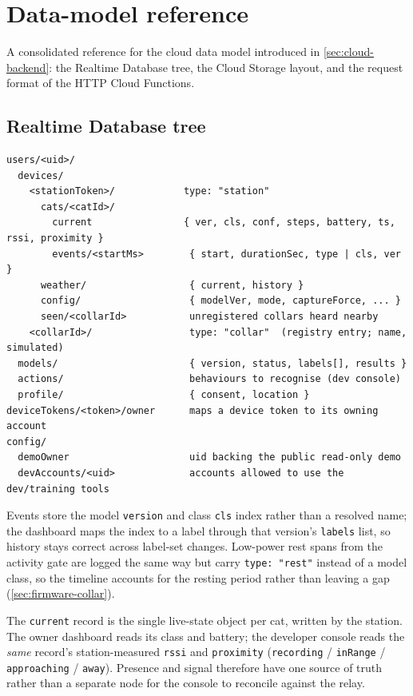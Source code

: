 \section{Data-model reference}
\label{sec:appendix-schema}

A consolidated reference for the cloud data model introduced in \cref{sec:cloud-backend}: the Realtime
Database tree, the Cloud Storage layout, and the request format of the HTTP Cloud Functions.

\subsection{Realtime Database tree}

\begin{lstlisting}[numbers=none,caption={Realtime Database layout (owner-scoped).},label={lst:rtdb}]
users/<uid>/
  devices/
    <stationToken>/            type: "station"
      cats/<catId>/
        current                { ver, cls, conf, steps, battery, ts, rssi, proximity }
        events/<startMs>        { start, durationSec, type | cls, ver }
      weather/                  { current, history }
      config/                   { modelVer, mode, captureForce, ... }
      seen/<collarId>           unregistered collars heard nearby
    <collarId>/                 type: "collar"  (registry entry; name, simulated)
  models/                       { version, status, labels[], results }
  actions/                      behaviours to recognise (dev console)
  profile/                      { consent, location }
deviceTokens/<token>/owner      maps a device token to its owning account
config/
  demoOwner                     uid backing the public read-only demo
  devAccounts/<uid>             accounts allowed to use the dev/training tools
\end{lstlisting}

Events store the model \texttt{version} and class \texttt{cls} index rather than a resolved name; the
dashboard maps the index to a label through that version's \texttt{labels} list, so history stays
correct across label-set changes. Low-power rest spans from the activity gate are logged the same way
but carry \texttt{type:\,"rest"} instead of a model class, so the timeline accounts for the resting
period rather than leaving a gap (\cref{sec:firmware-collar}).

The \texttt{current} record is the single live-state object per cat, written by the station. The owner
dashboard reads its class and battery; the developer console reads the \emph{same} record's
station-measured \texttt{rssi} and \texttt{proximity} (\texttt{recording} / \texttt{inRange} /
\texttt{approaching} / \texttt{away}). Presence and signal therefore have one source of truth rather
than a separate node for the console to reconcile against the relay.

